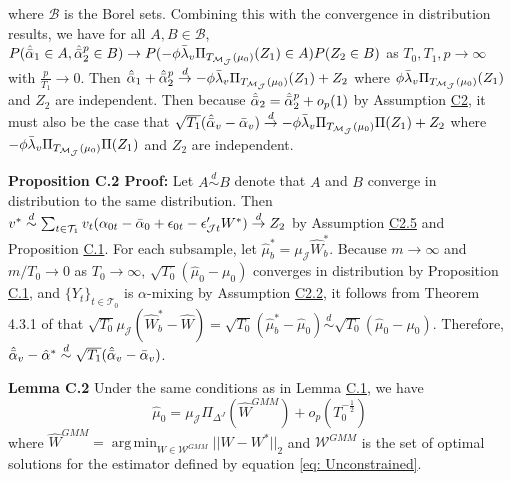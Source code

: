 \documentclass{article}
\DeclareMathOperator*{\argmin}{arg\,min}
\begin{document}
where $\mathcal{B}$ is the Borel sets. Combining this with the convergence in distribution results, we have for all $A,B \in \mathcal{B}$, $P(\hat{\Bar{\alpha}}_1 \in A, \hat{\Bar{\alpha}}_2^p \in B) \rightarrow P(-\phi \Bar{\lambda}_v \Pi_{T_{\mathcal{M}_{\mathcal{J}}}(\mu_0)}(Z_1) \in A)P(Z_2 \in B)$ as $T_0, T_1, p \rightarrow \infty$ with $\frac{p}{T_1} \rightarrow 0$. Then $\hat{\Bar{\alpha}}_1 + \hat{\Bar{\alpha}}_2^p \overset{d}{\rightarrow} -\phi \Bar{\lambda}_v \Pi_{T_{\mathcal{M}_{\mathcal{J}}}(\mu_0)} (Z_1) + Z_2$ where $\phi \Bar{\lambda}_v \Pi_{T_{\mathcal{M}_{\mathcal{J}}}(\mu_0)} (Z_1)$ and $Z_2$ are independent. Then because $ \hat{\Bar{\alpha}}_2 = \hat{\Bar{\alpha}}_2^p + o_p(1)$ by Assumption \hyperref[AC2]{C2}, it must also be the case that $\sqrt{T_1}(\hat{\Bar{\alpha}}_v - \Bar{\alpha}_v) \overset{d}{\rightarrow} -\phi \Bar{\lambda}_v \Pi_{T_{\mathcal{M}_{\mathcal{J}}}(\mu_0)} \Pi (Z_1) + Z_2$ where $ -\phi \Bar{\lambda}_v \Pi_{T_{\mathcal{M}_{\mathcal{J}}}(\mu_0)} \Pi (Z_1)$ and $Z_2$ are independent.

\textbf{Proposition C.2 Proof:} Let $A \overset{d}{\sim} B$ denote that $A$ and $B$ converge in distribution to the same distribution. Then $v^* \overset{d}{\sim} \sum_{t \in \mathcal{T}_1} v_t (\alpha_{0t} - \Bar{\alpha}_0 + \epsilon_{0t} - \epsilon_{\mathcal{J}t}'W^*) \overset{d}{\rightarrow} Z_2$ by Assumption \hyperref[AC2]{C2.5} and Proposition \hyperref[PC1]{C.1}. For each subsample, let $\hat{\mu}_b^* = \mu_{\mathcal{J}} \hat{W}_b^*$. Because $m \rightarrow \infty$ and $m/T_0 \rightarrow 0$ as $T_0 \rightarrow \infty$, $\sqrt{T_0}(\hat{\mu}_0 - \mu_0)$ converges in distribution by Proposition \hyperref[PC1]{C.1}, and $\{Y_t\}_{t \in \mathcal{T}_0}$ is $\alpha$-mixing by Assumption \hyperref[AC2]{C2.2}, it follows from Theorem 4.3.1 of \cite{SubsamplingBook} that $\sqrt{T_0}\mu_{\mathcal{J}}(\hat{W}_b^* - \hat{W}) = \sqrt{T_0}(\hat{\mu}_b^* - \hat{\mu}_0) \overset{d}{\sim} \sqrt{T_0}(\hat{\mu}_0 - \mu_0)$. Therefore, $\hat{\Bar{\alpha}}_v - \hat{\alpha}^* \overset{d}{\sim} \sqrt{T_1}(\hat{\Bar{\alpha}}_v - \Bar{\alpha}_v)$.

\textbf{Lemma C.2} \label{LC2} Under the same conditions as in Lemma \hyperref[LC1]{C.1}, we have
\begin{equation*}
    \hat{\mu}_0 = \mu_{\mathcal{J}} \Pi_{\Delta^J} (\hat{W}^{GMM}) + o_p(T_0^{-\frac{1}{2}})
\end{equation*}
where $\hat{W}^{GMM} = \argmin_{W \in \mathcal{W}^{GMM}} ||W - W^*||_2$ and $\mathcal{W}^{GMM}$ is the set of optimal solutions for the estimator defined by equation \eqref{eq: Unconstrained}.
\end{document}
